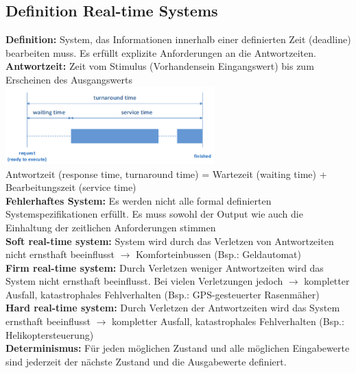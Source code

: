 \subsection{Definition Real-time Systems}
\textbf{Definition:} System, das Informationen innerhalb einer definierten Zeit
(deadline) bearbeiten muss. Es erfüllt explizite Anforderungen an die
Antwortzeiten.\\
\textbf{Antwortzeit:} Zeit vom Stimulus (Vorhandensein
Eingangswert) bis zum Erscheinen des Ausgangswerts\\
{\centering
\includegraphics[height=3cm]{images/RTSystems/Task_Zeitdef.png}\\}
Antwortzeit (response time, turnaround time) =  Wartezeit (waiting time) + Bearbeitungszeit (service time)\\
\textbf{Fehlerhaftes System:} Es werden nicht alle formal definierten Systemspezifikationen erfüllt.
Es muss sowohl der Output wie auch die Einhaltung der zeitlichen Anforderungen stimmen\\
\textbf{Soft real-time system:} System wird durch das Verletzen von
Antwortzeiten nicht ernsthaft beeinflusst $\rightarrow$ Komforteinbussen (Bsp.:
Geldautomat)\\
\textbf{Firm real-time system:} Durch Verletzen weniger Antwortzeiten wird das
System nicht ernsthaft beeinflusst. Bei vielen Verletzungen jedoch $\rightarrow$
kompletter Ausfall, katastrophales Fehlverhalten (Bsp.: GPS-gesteuerter
Rasenmäher)\\
\textbf{Hard real-time system:} Durch Verletzen der Antwortzeiten wird das
System ernsthaft beeinflusst $\rightarrow$ kompletter Ausfall, katastrophales
Fehlverhalten (Bsp.: Helikoptersteuerung)\\
\textbf{Determinismus:} Für jeden möglichen Zustand und alle möglichen
Eingabewerte sind jederzeit der nächste Zustand und die Ausgabewerte definiert.

